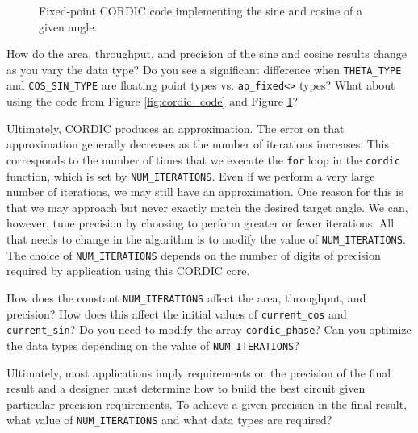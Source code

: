 \begin{figure}
\begin{tiny}

\end{tiny}
\caption{Fixed-point CORDIC code implementing the sine and cosine of a given angle.}\label{fig:cordic_fixed_code}
\end{figure}

\begin{exercise}
How do the area, throughput, and precision of the sine and cosine results change as you vary the data type?  Do you see a significant difference when \lstinline{THETA_TYPE} and \lstinline{COS_SIN_TYPE} are floating point types vs. \lstinline{ap_fixed<>} types?  What about using the code from Figure \ref{fig:cordic_code} and Figure \ref{fig:cordic_fixed_code}?
\end{exercise}

Ultimately, CORDIC produces an approximation. The error on that approximation generally decreases as the number of iterations increases. This corresponds to the number of times that we execute the \lstinline{for} loop in the \lstinline{cordic} function, which is set by \lstinline{NUM_ITERATIONS}.  Even if we perform a very large number of iterations, we may still have an approximation. One reason for this is that we may approach but never exactly match the desired target angle. We can, however, tune precision by choosing to perform greater or fewer iterations. All that needs to change in the algorithm is to modify the value of \lstinline{NUM_ITERATIONS}. The choice of \lstinline{NUM_ITERATIONS} depends on the number of digits of precision required by application using this CORDIC core.

\begin{exercise}
How does the constant \lstinline{NUM_ITERATIONS} affect the area, throughput, and precision? How does this affect the initial values of \lstinline{current_cos} and \lstinline{current_sin}? Do you need to modify the array \lstinline{cordic_phase}? Can you optimize the data types depending on the value of \lstinline{NUM_ITERATIONS}?
\end{exercise}

\begin{exercise}
Ultimately, most applications imply requirements on the precision of the final result and a designer must determine how to build the best circuit given particular precision requirements.  To achieve a given precision in the final result, what value of \lstinline{NUM_ITERATIONS} and what data types are required?
\end{exercise}

